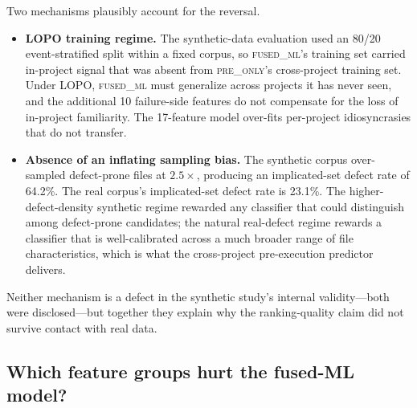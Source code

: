 \documentclass[preprint,12pt]{elsarticle}
\begin{document}
Two mechanisms plausibly account for the reversal.
\begin{itemize}
\item \textbf{LOPO training regime.} The synthetic-data evaluation used an 80/20 event-stratified split within a fixed corpus, so \textsc{fused\_ml}'s training set carried in-project signal that was absent from \textsc{pre\_only}'s cross-project training set. Under LOPO, \textsc{fused\_ml} must generalize across projects it has never seen, and the additional 10 failure-side features do not compensate for the loss of in-project familiarity. The 17-feature model over-fits per-project idiosyncrasies that do not transfer.
\item \textbf{Absence of an inflating sampling bias.} The synthetic corpus over-sampled defect-prone files at $2.5\times$, producing an implicated-set defect rate of 64.2\%. The real corpus's implicated-set defect rate is 23.1\%. The higher-defect-density synthetic regime rewarded any classifier that could distinguish among defect-prone candidates; the natural real-defect regime rewards a classifier that is well-calibrated across a much broader range of file characteristics, which is what the cross-project pre-execution predictor delivers.
\end{itemize}
Neither mechanism is a defect in the synthetic study's internal validity---both were disclosed---but together they explain why the ranking-quality claim did not survive contact with real data.

\subsection{Which feature groups hurt the fused-ML model?}
\label{sec:discussion-ablation}
\end{document}
